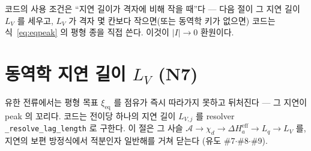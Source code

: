 \documentclass[11pt,a4paper]{article}
\newcommand{\eff}{\mathrm{eff}}
\newcommand{\eq}{\mathrm{eq}}
\newcommand{\code}[1]{\texttt{#1}}
\begin{document}
코드의 사용 조건은 ``지연 길이가 격자에 비해 작을 때''다 --- 다음 절이 그 지연 길이 $L_V$ 를 세우고, $L_V$ 가 격자
몇 칸보다 작으면(또는 동역학 키가 없으면) 코드는 식~\eqref{eq:eqpeak} 의 평형 종을 직접 쓴다. 이것이 $|I|\to0$ 환원이다.

\section{동역학 지연 길이 $L_V$ (N7)}\label{sec:lag}
유한 전류에서는 평형 목표 $\xi_\eq$ 를 점유가 즉시 따라가지 못하고 뒤처진다 --- 그 지연이 peak 의 꼬리다. 코드는 전이당
하나의 지연 길이 $L_{V,j}$ 를 resolver \code{\_resolve\_lag\_length} 로 구한다. 이 절은 그 사슬
$\mathcal A\to\chi_d\to\Delta H_a^\eff\to L_q\to L_V$ 를, 지연의 보편 방정식에서 적분인자 일반해를 거쳐 닫는다
(유도 \#7$\cdot$\#8$\cdot$\#9).
\end{document}
